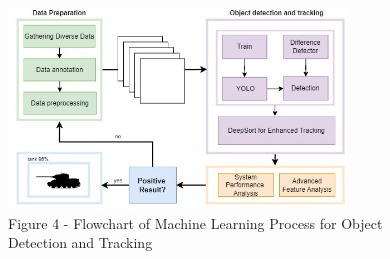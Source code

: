 \begin{figure}[H]
	\centering
	\includegraphics[width=0.8\textwidth]{assets/15}
	\caption*{Figure 4 - Flowchart of Machine Learning Process for Object Detection and Tracking}
\end{figure}

